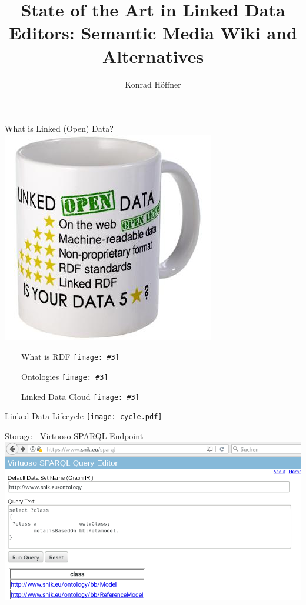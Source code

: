 \documentclass[aspectratio=1610]{beamer}
\title{State of the Art in Linked Data Editors: Semantic Media Wiki and Alternatives}
\author{Konrad Höffner}
\newcommand{\imageslide}[4][]
{
\begin{frame}[plain]{~~~~#2}
\vspace{0.2em}
\centering\texttt{[image: \#3]}
\\#1
\note{#4}
\end{frame}
}
\begin{document}
\begin{frame}
\titlepage
\end{frame}

\begin{frame}{What is Linked (Open) Data?}
\centering
\includegraphics[height=0.5\textheight]{img/linked-data-mug.jpg}
\end{frame}

\imageslide{What is RDF}{img/spider.png}{}{}

\imageslide{Ontologies}{img/hitontology.pdf}{}{}

\imageslide{Linked Data Cloud}{img/lodcloud-excerpt-inverted.png}{}{}

\begin{frame}{Linked Data Lifecycle}
\centering
\texttt{[image: cycle.pdf]}
\end{frame}

\begin{frame}{Storage---Virtuoso SPARQL Endpoint}
\centering
\includegraphics[width=\textwidth]{img/sparqlresult.png}
\end{frame}
\end{document}

